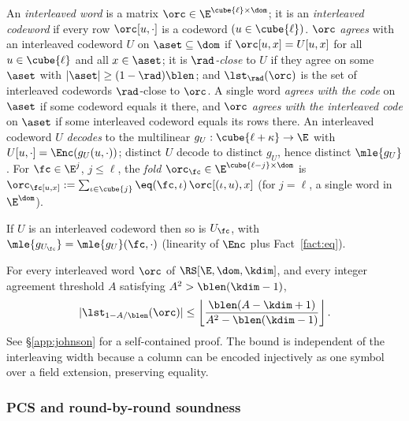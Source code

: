 \begin{definition}\label{def:interleaved}
An \emph{interleaved word} is a matrix $\orc \in \E^{\cube{\ell} \times \dom}$; it is an \emph{interleaved codeword} if every row $\orc[u, \cdot]$ is a codeword $(u \in \cube{\ell})$. $\orc$ \emph{agrees} with an interleaved codeword $U$ on $\aset \subseteq \dom$ if $\orc[u,x] = U[u,x]$ for all $u \in \cube{\ell}$ and all $x \in \aset$; it is \emph{$\rad$-close} to $U$ if they agree on some $\aset$ with $|\aset| \ge (1-\rad)\blen$; and $\lst_\rad(\orc)$ is the set of interleaved codewords $\rad$-close to $\orc$. A single word \emph{agrees with the code} on $\aset$ if some codeword equals it there, and $\orc$ \emph{agrees with the interleaved code} on $\aset$ if some interleaved codeword equals its rows there. An interleaved codeword $U$ \emph{decodes} to the multilinear $g_U : \cube{\ell + \kappa} \to \E$ with $U[u, \cdot] = \Enc(g_U(u, \cdot))$; distinct $U$ decode to distinct $g_U$, hence distinct $\mle{g_U}$. For $\fc \in \E^{j}$, $j \le \ell$, the \emph{fold} $\orc_\fc \in \E^{\cube{\ell - j} \times \dom}$ is $\orc_\fc[u, x] := \sum_{\iota \in \cube{j}} \eq(\fc, \iota)\, \orc[(\iota, u), x]$ (for $j = \ell$, a single word in $\E^{\dom}$).
\end{definition}

\begin{fact}\label{fact:fold-decode}
If $U$ is an interleaved codeword then so is $U_\fc$, with $\mle{g_{U_\fc}} = \mle{g_U}(\fc, \cdot)$ (linearity of $\Enc$ plus Fact~\ref{fact:eq}).
\end{fact}

\begin{theorem}\label{thm:johnson-interleaved}
For every interleaved word $\orc$ of $\RS[\E,\dom,\kdim]$, and every integer agreement threshold $A$ satisfying $A^2>\blen(\kdim-1)$,
\[
 |\lst_{1-A/\blen}(\orc)| \le \left\lfloor\frac{\blen(A-\kdim+1)}{A^2-\blen(\kdim-1)}\right\rfloor.
\]
See \S\ref{app:johnson} for a self-contained proof. The bound is independent of the interleaving width because a column can be encoded injectively as one symbol over a field extension, preserving equality.
\end{theorem}

\subsubsection{PCS and round-by-round soundness}\label{sec:iopcs}


